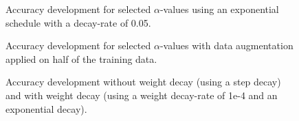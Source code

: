 \documentclass[10pt,twocolumn,letterpaper]{article}
\begin{document}
\begin{figure}
	\centering
	\caption[]{Accuracy development for selected $\alpha$-values using an exponential schedule with a decay-rate of 0.05.}
	\label{appendix:failed1}
\end{figure}
\begin{figure}
	\centering
	\caption[]{Accuracy development for selected $\alpha$-values with data augmentation applied on half of the training data.}
	\label{appendix:failed2}
\end{figure}
\begin{figure}[hpbt]
	\centering
	\caption[]{Accuracy development without weight decay (using a step decay) and with weight decay (using a weight decay-rate of 1e-4 and an exponential decay).}
	\label{appendix:failed4}
\end{figure}
\end{document}
